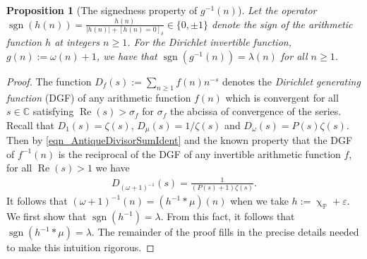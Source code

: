 \documentclass[11pt,reqno,a4letter]{article}
\numberwithin{figure}{section}
\numberwithin{table}{section}
\newcommand{\Iverson}[1]{\ensuremath{\left[#1\right]_{\delta}}}
\renewcommand{\chi}{\upchi}
\theoremstyle{plain}
\newtheorem{prop}[theorem]{Proposition}
\numberwithin{theorem}{section}
\theoremstyle{definition}
\newcommand{\NBRef}[1]{}
\renewcommand{\Re}{\operatorname{Re}}
\begin{document}
\begin{prop}[The signedness property of $g^{-1}(n)$]
\label{prop_SignageDirInvsOfPosBddArithmeticFuncs_v1} 
Let the operator 
$\operatorname{sgn}(h(n)) = \frac{h(n)}{|h(n)| + \Iverson{h(n) = 0}} \in \{0, \pm 1\}$ denote the sign 
of the arithmetic function $h$ at integers $n \geq 1$. 
For the Dirichlet invertible function, $g(n) := \omega(n) + 1$, 
we have that $\operatorname{sgn}(g^{-1}(n)) = \lambda(n)$ for all $n \geq 1$. 
\NBRef{A02-2020-04-26}
\end{prop} 
\begin{proof} 
The function $D_f(s) := \sum_{n \geq 1} f(n) n^{-s}$ denotes the 
\emph{Dirichlet generating function} (DGF) of any 
arithmetic function $f(n)$ which is convergent for all $s \in \mathbb{C}$ satisfying 
$\Re(s) > \sigma_f$ for $\sigma_f$ the abcissa of convergence of the series. 
Recall that $D_1(s) = \zeta(s)$, $D_{\mu}(s) = 1 / \zeta(s)$ and $D_{\omega}(s) = P(s) \zeta(s)$. 
Then by \eqref{eqn_AntiqueDivisorSumIdent} and the known property that the DGF of $f^{-1}(n)$ is 
the reciprocal of the DGF of any invertible arithmetic function $f$, for all $\Re(s) > 1$ we have 
\begin{align} 
\label{eqn_DGF_of_gInvn} 
D_{(\omega+1)^{-1}}(s) = \frac{1}{(P(s)+1) \zeta(s)}. 
\end{align} 
It follows that $(\omega + 1)^{-1}(n) = (h^{-1} \ast \mu)(n)$ when we take 
$h := \chi_{\mathbb{P}} + \varepsilon$. 
We first show that $\operatorname{sgn}(h^{-1}) = \lambda$. From this fact, it follows 
that $\operatorname{sgn}(h^{-1} \ast \mu) = \lambda$. The remainder of the proof fills in the 
precise details needed to make this intuition rigorous. 


\end{proof}
\end{document}
